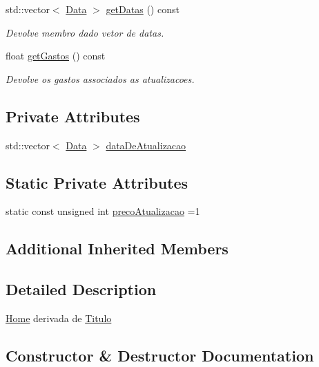 \begin{DoxyCompactItemize}
std\+::vector$<$ \mbox{\hyperlink{class_data}{Data}} $>$ \mbox{\hyperlink{class_home_a0ab7279a76525f48cb1b64b8bae98a44}{get\+Datas}} () const
\begin{DoxyCompactList}\small\item\em Devolve membro dado vetor de datas. \end{DoxyCompactList}\item 
float \mbox{\hyperlink{class_home_aff6d69739d404378524a591596b47856}{get\+Gastos}} () const
\begin{DoxyCompactList}\small\item\em Devolve os gastos associados as atualizacoes. \end{DoxyCompactList}\end{DoxyCompactItemize}
\subsection*{Private Attributes}
\begin{DoxyCompactItemize}
\item 
std\+::vector$<$ \mbox{\hyperlink{class_data}{Data}} $>$ \mbox{\hyperlink{class_home_a49b932bcc604234155ef43457a05f44c}{data\+De\+Atualizacao}}
\end{DoxyCompactItemize}
\subsection*{Static Private Attributes}
\begin{DoxyCompactItemize}
\item 
static const unsigned int \mbox{\hyperlink{class_home_a9066555b77a5d4fca0b9be1a0daa949b}{preco\+Atualizacao}} =1
\end{DoxyCompactItemize}
\subsection*{Additional Inherited Members}


\subsection{Detailed Description}
\mbox{\hyperlink{class_home}{Home}} derivada de \mbox{\hyperlink{class_titulo}{Titulo}} 

\subsection{Constructor \& Destructor Documentation}
\mbox{\label{class_home_aea37c4a72119815e8e0a83b63f345cc9}} 
